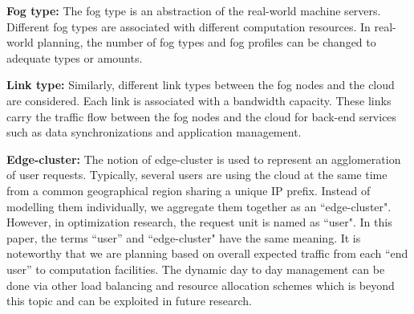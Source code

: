 \documentclass[10pt,journal,compsoc]{IEEEtran}
\begin{document}
\textbf{Fog type: }The fog type is an abstraction of the real-world machine servers. Different fog types are associated with different computation resources. In real-world planning, the number of fog types and fog profiles can be changed to adequate types or amounts.

\textbf{Link type: }Similarly, different link types between the fog nodes and the cloud are considered. Each link is associated with a bandwidth capacity. These links carry the traffic flow between the fog nodes and the cloud for back-end services such as data synchronizations and application management.

\textbf{Edge-cluster: }The notion of edge-cluster is used to represent an agglomeration of user requests. Typically, several users are using the cloud at the same time from a common geographical region sharing a unique IP prefix. Instead of modelling them individually, we aggregate them together as an ``edge-cluster". However, in optimization research, the request unit is named as ``user". In this paper, the terms ``user'' and ``edge-cluster" have the same meaning.
It is noteworthy that we are planning based on overall expected traffic from each ``end user'' to computation facilities. The dynamic day to day management can be done via other load balancing and resource allocation schemes which is beyond this topic and can be exploited in future research.

\end{document}
